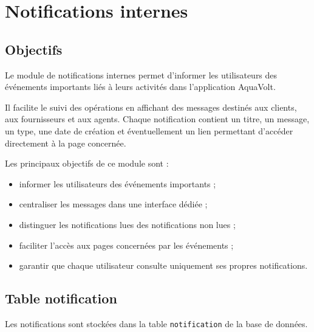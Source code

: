 
\chapter{Notifications internes}
\label{chap:notifications}

\section{Objectifs}

Le module de notifications internes permet d'informer les utilisateurs des événements importants liés à leurs activités dans l'application AquaVolt.

Il facilite le suivi des opérations en affichant des messages destinés aux clients, aux fournisseurs et aux agents. Chaque notification contient un titre, un message, un type, une date de création et éventuellement un lien permettant d'accéder directement à la page concernée.

Les principaux objectifs de ce module sont :
\begin{itemize}
    \item informer les utilisateurs des événements importants ;
    \item centraliser les messages dans une interface dédiée ;
    \item distinguer les notifications lues des notifications non lues ;
    \item faciliter l'accès aux pages concernées par les événements ;
    \item garantir que chaque utilisateur consulte uniquement ses propres notifications.
\end{itemize}

\section{Table notification}

Les notifications sont stockées dans la table \texttt{notification} de la base de données.


